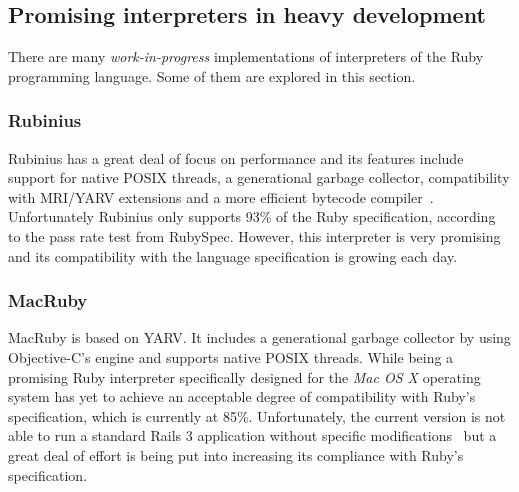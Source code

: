 \subsection{Promising interpreters in heavy development}

There are many \textit{work-in-progress} implementations of interpreters of the Ruby programming language. Some of them are explored in this section.

\subsubsection{Rubinius}

Rubinius has a great deal of focus on performance and its features include support for native POSIX threads, a generational garbage collector, compatibility with MRI/YARV extensions and a more efficient bytecode compiler~\cite{rubinius, rubinius_virtual_machine, rubinius_virtual_machine_rewrite}. Unfortunately Rubinius only supports 93\% of the Ruby specification, according to the pass rate test from RubySpec. However, this interpreter is very promising and its compatibility with the language specification is growing each day.


\subsubsection{MacRuby}

MacRuby is based on YARV. It includes a generational garbage collector by using Objective-C's engine and supports native POSIX threads. While being a promising Ruby interpreter specifically designed for the \textit{Mac OS X} operating system has yet to achieve an acceptable degree of compatibility with Ruby's specification, which is currently at 85\%. Unfortunately, the current version is not able to run a standard Rails 3 application without specific modifications~\cite{macruby_06} but a great deal of effort is being put into increasing its compliance with Ruby's specification.
